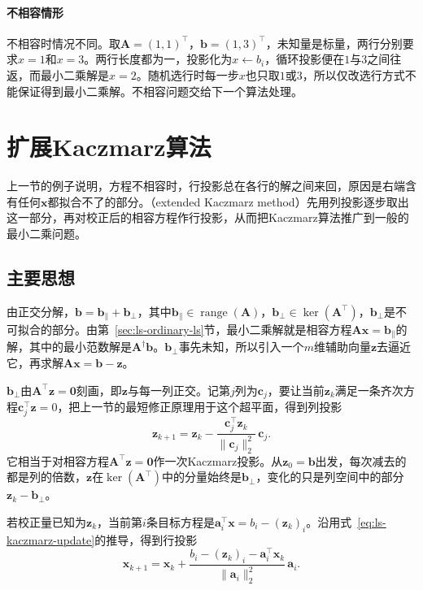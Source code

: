 \paragraph{不相容情形}
不相容时情况不同。取$\bm A=(1,1)^\top$，$\bm b=(1,3)^\top$，未知量是标量，两行分别要求$x=1$和$x=3$。两行长度都为一，投影化为$x\gets b_i$，循环投影便在$1$与$3$之间往返，而最小二乘解是$\hat x=2$。随机选行时每一步$x$也只取$1$或$3$，所以仅改选行方式不能保证得到最小二乘解。不相容问题交给下一个算法处理。

\section{扩展Kaczmarz算法}
\label{sec:ls-extended-kaczmarz}

上一节的例子说明，方程不相容时，行投影总在各行的解之间来回，原因是右端含有任何$\bm x$都拟合不了的部分。（extended Kaczmarz method）先用列投影逐步取出这一部分，再对校正后的相容方程作行投影，从而把Kaczmarz算法推广到一般的最小二乘问题。

\subsection{主要思想}

由正交分解，$\bm b=\bm b_\parallel+\bm b_\perp$，其中$\bm b_\parallel\in\operatorname{range}(\bm A)$，$\bm b_\perp\in\ker(\bm A^\top)$，$\bm b_\perp$是不可拟合的部分。由第~\ref{sec:ls-ordinary-ls}节，最小二乘解就是相容方程$\bm A\bm x=\bm b_\parallel$的解，其中的最小范数解是$\bm A^\dagger\bm b$。$\bm b_\perp$事先未知，所以引入一个$m$维辅助向量$\bm z$去逼近它，再求解$\bm A\bm x=\bm b-\bm z$。

$\bm b_\perp$由$\bm A^\top\bm z=\bm0$刻画，即$\bm z$与每一列正交。记第$j$列为$\bm c_j$，要让当前$\bm z_k$满足一条齐次方程$\bm c_j^\top\bm z=0$，把上一节的最短修正原理用于这个超平面，得到列投影
\begin{equation}
 \bm z_{k+1}=\bm z_k-\frac{\bm c_j^\top\bm z_k}{\lVert\bm c_j\rVert_2^2}\,\bm c_j .
 \label{eq:ls-extended-kaczmarz-column}
\end{equation}
它相当于对相容方程$\bm A^\top\bm z=\bm0$作一次Kaczmarz投影。从$\bm z_0=\bm b$出发，每次减去的都是列的倍数，$\bm z$在$\ker(\bm A^\top)$中的分量始终是$\bm b_\perp$，变化的只是列空间中的部分$\bm z_k-\bm b_\perp$。

若校正量已知为$\bm z_k$，当前第$i$条目标方程是$\bm a_i^\top\bm x=b_i-(\bm z_k)_i$。沿用式~\eqref{eq:ls-kaczmarz-update}的推导，得到行投影
\begin{equation}
 \bm x_{k+1}=\bm x_k+\frac{b_i-(\bm z_k)_i-\bm a_i^\top\bm x_k}{\lVert\bm a_i\rVert_2^2}\,\bm a_i .
 \label{eq:ls-extended-kaczmarz-row}
\end{equation}

